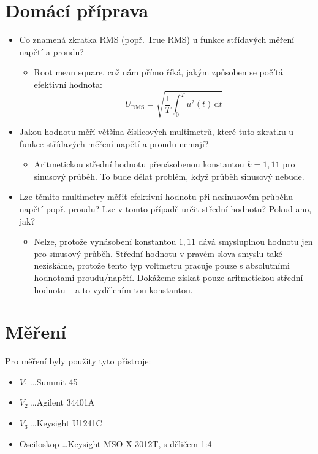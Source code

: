 \documentclass[a4paper,12pt]{article}
\begin{document}
\section{Domácí příprava}
\begin{itemize}
  \item Co znamená zkratka RMS (popř. True RMS) u funkce střídavých měření napětí a proudu?
    \begin{itemize}
      \item Root mean square, což nám přímo říká, jakým způsoben se počítá efektivní hodnota:
      $$
        U_{\mathrm{RMS}} = \sqrt{\frac{1}{T} \int_0^T u^2(t)\,\mathrm{d}t}
      $$
    \end{itemize}
  \item Jakou hodnotu měří většina číslicových multimetrů, které tuto zkratku u funkce střídavých měření napětí a proudu nemají?
    \begin{itemize}
      \item Aritmetickou střední hodnotu přenásobenou konstantou $k = 1,11$ pro sinusový průběh. To bude dělat problém, když průběh sinusový nebude.
    \end{itemize}
  \item Lze těmito multimetry měřit efektivní hodnotu při nesinusovém průběhu napětí popř. proudu? Lze v tomto případě určit střední hodnotu? Pokud ano, jak?
    \begin{itemize}
      \item Nelze, protože vynásobení konstantou $1,11$ dává smysluplnou hodnotu jen pro sinusový průběh. Střední hodnotu v pravém slova smyslu také nezískáme, protože tento typ voltmetru pracuje pouze s absolutními hodnotami proudu/napětí. Dokážeme získat pouze aritmetickou střední hodnotu -- a to vydělením tou konstantou.
    \end{itemize}
\end{itemize}

\section{Měření}
Pro měření byly použity tyto přístroje:
\begin{itemize}
  \item $V_1$ \dots Summit 45
  \item $V_2$ \dots Agilent 34401A
  \item $V_3$ \dots Keysight U1241C
  \item Osciloskop \dots Keysight MSO-X 3012T, s děličem 1:4
\end{itemize}
\end{document}
